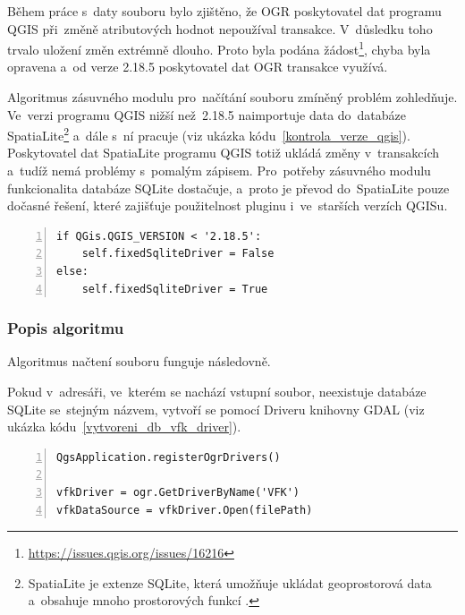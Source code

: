 Během práce s~daty souboru  bylo zjištěno, že OGR poskytovatel dat programu QGIS při~změně atributových hodnot nepoužíval transakce. V~důsledku toho trvalo uložení změn extrémně dlouho. Proto byla podána žádost\footnote{\url{https://issues.qgis.org/issues/16216}}, chyba byla opravena a~od verze 2.18.5 poskytovatel dat OGR transakce využívá.

Algoritmus zásuvného modulu pro~načítání  souboru zmíněný problém zohledňuje. Ve~verzi programu QGIS nižší než~2.18.5 naimportuje data do~databáze SpatiaLite\footnote{SpatiaLite je extenze SQLite, která umožňuje ukládat geoprostorová data a~obsahuje mnoho prostorových funkcí \citep{spatialite} \citep{wiki_spatialite}.} a~dále s~ní pracuje (viz ukázka kódu~\ref{kontrola_verze_qgis}). Poskytovatel dat SpatiaLite programu QGIS totiž ukládá změny v~transakcích a~tudíž nemá problémy s~pomalým zápisem. Pro~potřeby zásuvného modulu funkcionalita databáze SQLite dostačuje, a~proto je převod do~SpatiaLite pouze dočasné řešení, které zajišťuje použitelnost pluginu i~ve~starších verzích QGISu.

{\scriptsize
\begin{lstlisting}[style=python, caption={Kontrola verze programu QGIS}, captionpos=b, label=kontrola_verze_qgis, backgroundcolor = \color{light-gray},  numbers=left]
if QGis.QGIS_VERSION < '2.18.5':
    self.fixedSqliteDriver = False
else:
    self.fixedSqliteDriver = True
\end{lstlisting}}

\subsubsection{Popis algoritmu}
\label{popis_algoritmu_nacteni_vfk}

Algoritmus načtení  souboru funguje následovně.

Pokud v~adresáři, ve~kterém se nachází vstupní  soubor, neexistuje databáze SQLite se~stejným názvem, vytvoří se pomocí  Driveru knihovny GDAL (viz ukázka kódu~\ref{vytvoreni_db_vfk_driver}).

{\scriptsize
\begin{lstlisting}[style=python, caption={Vytvoření SQLite databáze pomocí VFK Driveru}, captionpos=b, label=vytvoreni_db_vfk_driver, backgroundcolor = \color{light-gray},  numbers=left]
QgsApplication.registerOgrDrivers()

vfkDriver = ogr.GetDriverByName('VFK')
vfkDataSource = vfkDriver.Open(filePath)
\end{lstlisting}}

